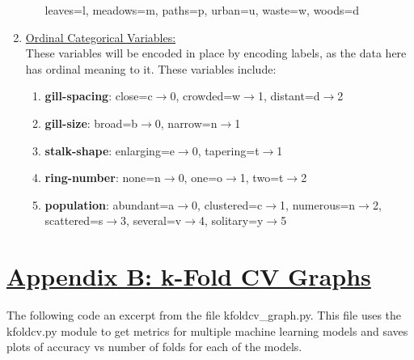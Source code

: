 \documentclass[fleqn]{article}
\begin{document}
\begin{enumerate}
\begin{enumerate}[label=\roman*.]
                leaves=l,
                meadows=m,
                paths=p,
                urban=u,
                waste=w,
                woods=d
        \end{enumerate}
        \item \underline{Ordinal Categorical Variables:}\\
        These variables will be encoded in place by encoding labels, as the data here has
        ordinal meaning to it. These variables include:
        \begin{enumerate}[label=\roman*.]
            \item \textbf{gill-spacing}:
                close=c$\to$0,
                crowded=w$\to$1,
                distant=d$\to$2
            \item \textbf{gill-size}:
                broad=b$\to$0,
                narrow=n$\to$1
            \item \textbf{stalk-shape}:
                enlarging=e$\to$0,
                tapering=t$\to$1
            \item \textbf{ring-number}:
                none=n$\to$0,
                one=o$\to$1,
                two=t$\to$2
            \item \textbf{population}:
                abundant=a$\to$0,
                clustered=c$\to$1,
                numerous=n$\to$2,
                scattered=s$\to$3,
                several=v$\to$4,
                solitary=y$\to$5
        \end{enumerate}
    \end{enumerate}

    \newpage
    \section*{\underline{Appendix B: k-Fold CV Graphs}}

    The following code an excerpt from the file kfoldcv\_graph.py. This file uses the
    kfoldcv.py module to get metrics for multiple machine learning models and saves plots
    of accuracy vs number of folds for each of the models.
\end{document}
